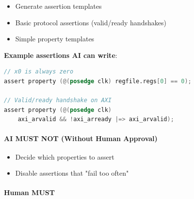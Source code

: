 \begin{record}

\begin{itemize}
\tightlist
\item
  Generate assertion templates
\item
  Basic protocol assertions (valid/\allowbreak{}ready handshakes)
\item
  Simple property templates
\end{itemize}

\textbf{Example assertions AI can write}:

\begin{lstlisting}[language=Verilog]
// x0 is always zero
assert property (@(posedge clk) regfile.regs[0] == 0);

// Valid/ready handshake on AXI
assert property (@(posedge clk)
    axi_arvalid && !axi_arready |=> axi_arvalid);
\end{lstlisting}

\end{record}

\paragraph{\texorpdfstring{\warn{} AI MUST NOT (Without Human
Approval)}{ AI MUST NOT (Without Human Approval)}}\label{cr:status:phase1-ai-human-responsibilities:warning-ai-must-not-without-human-approval-16}

\begin{record}

\begin{itemize}
\tightlist
\item
  Decide which properties to assert
\item
  Disable assertions that "fail too often"
\end{itemize}

\end{record}

\paragraph{\texorpdfstring{\hold{} Human MUST}{ Human MUST}}\label{cr:status:phase1-ai-human-responsibilities:raised-hand-human-must-16}


